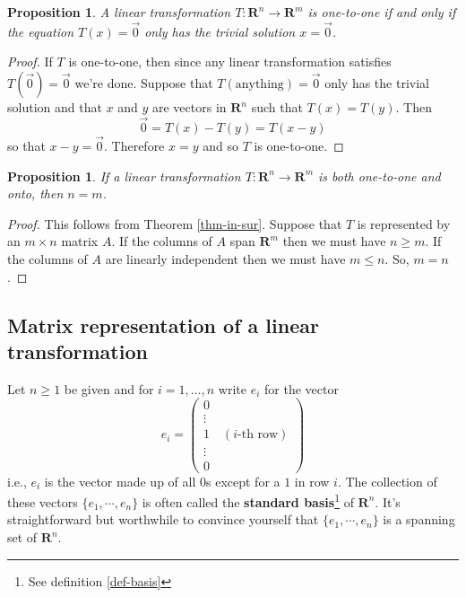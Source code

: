 \documentclass[12pt]{article}
\numberwithin{equation}{subsection}
\numberwithin{figure}{subsection}
\newtheorem{prop}[subsection]{Proposition}
\theoremstyle{note}
\begin{document}
\begin{prop} \label{thm-kernel}
	A linear transformation $T\colon \mathbf{R}^n\to\mathbf{R}^m$ is one-to-one if and only if the equation $T(x)=\vec{0}$ only has the trivial solution $x=\vec{0}$. 
\end{prop}

\begin{proof}
If $T$ is one-to-one, then since any linear transformation satisfies $T(\vec{0})=\vec{0}$ we're done. Suppose that $T( \text{anything} )=\vec{0}$ only has the trivial solution and that $x$ and $y$ are vectors in $\mathbf{R}^n$ such that $T(x)=T(y)$. Then \[ \vec{0}=T(x)-T(y)=T(x-y)\] so that $x-y=\vec{0}$. Therefore $x=y$ and so $T$ is one-to-one. 
\end{proof}

\begin{prop}
	If a linear transformation $T\colon \mathbf{R}^n\to\mathbf{R}^m$ is both one-to-one and onto, then $n=m$. 
\end{prop}
\begin{proof}
	This follows from Theorem \ref{thm-in-sur}. Suppose that $T$ is represented by an $m\times n$ matrix $A$. If the columns of $A$ span $\mathbf{R}^m$ then we must have $n\geq m$. If the columns of $A$ are linearly independent then we must have $m\leq n$. So, $m=n$.
\end{proof}
\subsection{Matrix representation of a linear transformation}
Let $n\geq 1$ be given and for $i=1,\dots,n$ write $e_i$ for the vector \begin{equation} e_i=\begin{pmatrix} 0  \\ \vdots \\ 1 \quad (\text{$i$-th row}) \\ \vdots \\ 0 \end{pmatrix}\end{equation} i.e., $e_i$ is the vector made up of all $0$s except for a $1$ in row $i$. The collection of these vectors $\{e_1,\cdots,e_n\}$ is often called the \textbf{standard basis}\footnote{See definition \ref{def-basis}} of $\mathbf{R}^n$. It's straightforward but worthwhile to convince yourself that $\{e_1,\cdots,e_n\}$ is a spanning set of $\mathbf{R}^n$.
\end{document}
